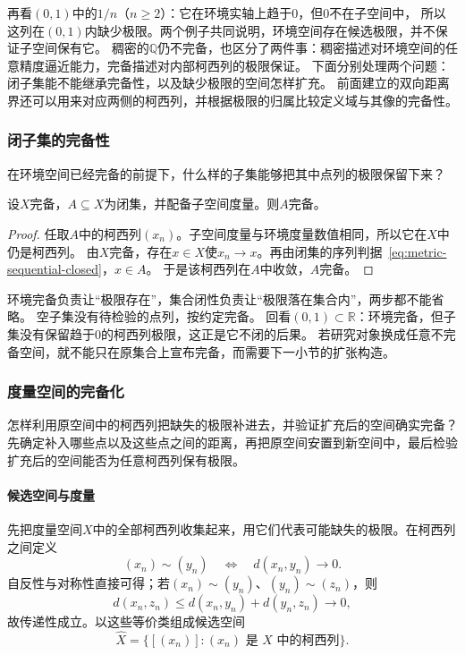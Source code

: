 再看$(0,1)$中的$1/n$（$n\geq2$）：它在环境实轴上趋于$0$，但$0$不在子空间中，
所以这列在$(0,1)$内缺少极限。两个例子共同说明，环境空间存在候选极限，并不保证子空间保有它。
稠密的$\mathbb Q$仍不完备，也区分了两件事：稠密描述对环境空间的任意精度逼近能力，完备描述对内部柯西列的极限保证。
下面分别处理两个问题：闭子集能不能继承完备性，以及缺少极限的空间怎样扩充。
前面建立的双向距离界还可以用来对应两侧的柯西列，并根据极限的归属比较定义域与其像的完备性。

\subsubsection{闭子集的完备性}
\label{sec:metric-closed-subspaces}

在环境空间已经完备的前提下，什么样的子集能够把其中点列的极限保留下来？

\begin{theorem}[完备空间的闭子集完备]
\label{thm:metric-closed-subspace-complete}
设$X$完备，$A\subseteq X$为闭集，并配备子空间度量。则$A$完备。
\end{theorem}

\begin{proof}
任取$A$中的柯西列$(x_n)$。子空间度量与环境度量数值相同，所以它在$X$中仍是柯西列。
由$X$完备，存在$x\in X$使$x_n\to x$。再由闭集的序列判据~\eqref{eq:metric-sequential-closed}，$x\in A$。
于是该柯西列在$A$中收敛，$A$完备。
\end{proof}

环境完备负责让“极限存在”，集合闭性负责让“极限落在集合内”，两步都不能省略。
空子集没有待检验的点列，按约定完备。
回看$(0,1)\subset\mathbb R$：环境完备，但子集没有保留趋于$0$的柯西列极限，这正是它不闭的后果。
若研究对象换成任意不完备空间，就不能只在原集合上宣布完备，而需要下一小节的扩张构造。

\subsubsection{度量空间的完备化}
\label{sec:metric-closed-subspaces-completion}

怎样利用原空间中的柯西列把缺失的极限补进去，并验证扩充后的空间确实完备？
先确定补入哪些点以及这些点之间的距离，再把原空间安置到新空间中，最后检验扩充后的空间能否为任意柯西列保有极限。

\paragraph{候选空间与度量}

先把度量空间$X$中的全部柯西列收集起来，用它们代表可能缺失的极限。在柯西列之间定义
\[
  (x_n)\sim(y_n)\quad\Longleftrightarrow\quad d(x_n,y_n)\to0.
\]
自反性与对称性直接可得；若$(x_n)\sim(y_n)$、$(y_n)\sim(z_n)$，则
\[
  d(x_n,z_n)\leq d(x_n,y_n)+d(y_n,z_n)\to0,
\]
故传递性成立。以这些等价类组成候选空间
\[
  \widehat X=\bigl\{[(x_n)]:(x_n)\text{ 是 }X\text{ 中的柯西列}\bigr\}.
\]


